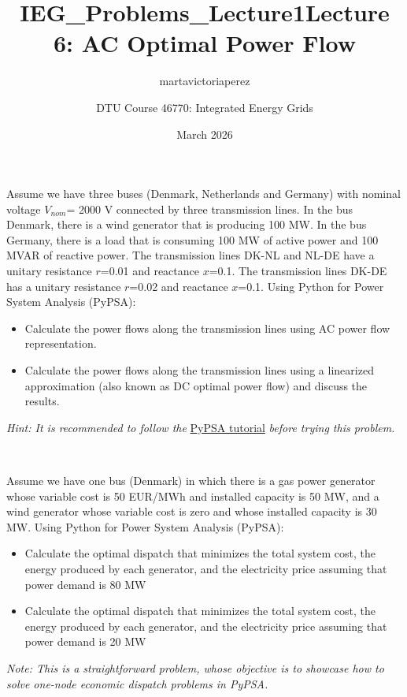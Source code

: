 \documentclass[10pt]{article}
\title{IEG_Problems_Lecture1}
\author{martavictoriaperez }
\date{March 2026}
\newenvironment{problem}[2][Problem]{\begin{trivlist}
\item[\hskip \labelsep {\bfseries #1}\hskip \labelsep {\bfseries #2.}]}{\end{trivlist}}
\begin{document}
 
\title{\textbf{Lecture 6: AC Optimal Power Flow}}
\author{
DTU Course 46770: Integrated Energy Grids }
\maketitle
\begin{problem}{6.1}
Assume we have three buses (Denmark, Netherlands and Germany) with nominal voltage $V_{nom}$= 2000 V connected by three transmission lines. In the bus Denmark, there is a wind generator that is producing 100 MW. In the bus Germany, there is a load that is consuming 100 MW of active power and 100 MVAR of reactive power. The transmission lines DK-NL and NL-DE have a unitary resistance $r$=0.01 and reactance $x$=0.1. The transmission lines DK-DE has a unitary resistance $r$=0.02 and reactance $x$=0.1. Using Python for Power System Analysis (PyPSA):

\begin{itemize}
\item[a)] Calculate the power flows along the transmission lines using AC power flow representation.

\item[b)]  Calculate the power flows along the transmission lines using a linearized approximation (also known as DC optimal power flow) and discuss the results.
\end{itemize}

\textit{Hint: It is recommended to follow the} \href{https://aleks-g.github.io/integrated-energy-grids/intro-pypsa.html#}{PyPSA tutorial} \textit{before trying this problem.}

\end{problem}

\

\begin{problem}{6.2}

Assume we have one bus (Denmark) in which there is a gas power generator whose variable cost is 50 EUR/MWh and installed capacity is 50 MW, and a wind generator whose variable cost is zero and whose installed capacity is 30 MW. Using Python for Power System Analysis (PyPSA):

\begin{itemize}
\item[a)] Calculate the optimal dispatch that minimizes the total system cost, the energy produced by each generator, and the electricity price assuming that power demand is 80 MW

\item[b)]  Calculate the optimal dispatch that minimizes the total system cost, the energy produced by each generator, and the electricity price assuming that power demand is 20 MW
\end{itemize}

\textit{Note: This is a straightforward problem, whose objective is to showcase how to solve one-node economic dispatch problems in PyPSA.}

\end{problem}
\end{document}
